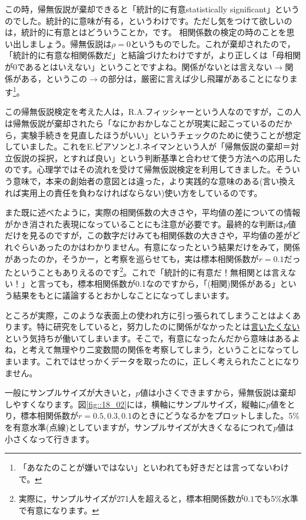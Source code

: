 \documentclass{ltjsarticle}
\begin{document}
この時，帰無仮説が棄却できると「統計的に有意statistically significant」というのでした。統計的に意味が有る，というわけです。ただし気をつけて欲しいのは，統計的に有意とはどういうことか，です。
相関係数の検定の時のことを思い出しましょう。帰無仮説は$\rho=0$というものでした。これが棄却されたので，「統計的に有意な相関係数だ」と結論づけたわけですが，より正しくは「母相関が0であるとはいえない」ということですよね。関係がないとは言えない$\to$関係がある，というこの$\to$の部分は，厳密に言えば少し飛躍があることになります\footnote{「あなたのことが嫌いではない」といわれても好きだとは言ってないわけで。}。

この帰無仮説検定を考えた人は，R.A.フィッシャーという人なのですが，この人は帰無仮説が棄却されたら「なにかおかしなことが現実に起こっているのだから，実験手続きを見直したほうがいい」というチェックのために使うことが想定していました。これをE.ピアソンとJ.ネイマンという人が「帰無仮説の棄却＝対立仮説の採択，とすれば良い」という判断基準と合わせて使う方法への応用したのです。心理学ではその流れを受けて帰無仮説検定を利用してきました。そういう意味で，本来の創始者の意図とは違った，より実践的な意味のある(言い換えれば実用上の責任を負わなければならない)使い方をしているのです。

また既に述べたように，実際の相関係数の大きさや，平均値の差についての情報がかき消された表現になっていることにも注意が必要です。最終的な判断は$p$値だけを見るのですが，この数字だけみても相関係数の大きさや，平均値の差がどれぐらいあったのかはわかりません。有意になったという結果だけをみて，関係があったのか，そうかー，と考察を巡らせても，実は標本相関係数が$r=0.1$だったということもありえるのです\footnote{実際に，サンプルサイズが271人を超えると，標本相関係数が$0.1$でも5\%水準で有意になります。}。これで「統計的に有意だ！無相関とは言えない！」と言っても，標本相関係数が0.1なのですから，「(相関)関係がある」という結果をもとに議論するとおかしなことになってしまいます。

ところが実際，このような表面上の使われ方に引っ張られてしまうことはよくあります。特に研究をしていると，努力したのに関係がなかったとは\underline{言いたくない}という気持ちが働いてしまいます。そこで，有意になったんだから意味はあるよね，と考えて無理やり二変数間の関係を考察してしまう，ということになってしまいます。これではせっかくデータを取ったのに，正しく考えられたことになりません。

一般にサンプルサイズが大きいと，$p$値は小さくできますから，帰無仮説は棄却しやすくなります。図\ref{fig::18_02}には，横軸にサンプルサイズ，縦軸に$p$値をとり，標本相関係数が$r=0.5,0.3,0.1$のときにどうなるかをプロットしました。5\%を有意水準(点線)としていますが，サンプルサイズが大きくなるにつれて$p$値は小さくなって行きます。
\end{document}
